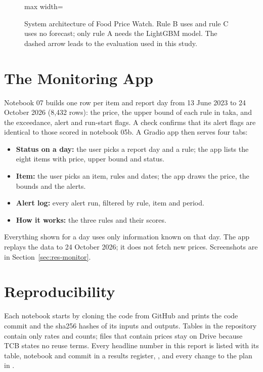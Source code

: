 \begin{figure}[H]
\begin{adjustbox}{max width=\linewidth}
\end{adjustbox}
\caption[System architecture]{System architecture of Food Price Watch. Rule B uses \naive{} and rule C uses no forecast; only rule A needs the LightGBM model. The dashed arrow leads to the evaluation used in this study.}
\label{fig:arch}
\end{figure}

\section{The Monitoring App}\label{sec:method-monitor}
Notebook 07 builds one row per item and report day from 13 June 2023 to 24 October 2026 (8,432 rows): the price, the upper bound of each rule in taka, and the exceedance, alert and run-start flags. A check confirms that its alert flags are identical to those scored in notebook 05b. A Gradio app \cite{gradio} then serves four tabs:
\begin{itemize}[leftmargin=*,itemsep=1pt]
\item \textbf{Status on a day:} the user picks a report day and a rule; the app lists the eight items with price, upper bound and status.
\item \textbf{Item:} the user picks an item, rules and dates; the app draws the price, the bounds and the alerts.
\item \textbf{Alert log:} every alert run, filtered by rule, item and period.
\item \textbf{How it works:} the three rules and their scores.
\end{itemize}
Everything shown for a day uses only information known on that day. The app replays the data to 24 October 2026; it does not fetch new prices. Screenshots are in Section~\ref{sec:res-monitor}.

\section{Reproducibility}
Each notebook starts by cloning the code from GitHub and prints the code commit and the sha256 hashes of its inputs and outputs. Tables in the repository contain only rates and counts; files that contain prices stay on Drive because TCB states no reuse terms. Every headline number in this report is listed with its table, notebook and commit in a results register, , and every change to the plan in .
